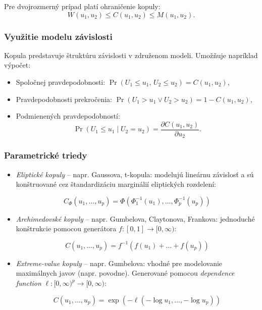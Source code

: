 Pre dvojrozmerný prípad platí ohraničenie kopuly:
\[
W(u_1, u_2) \leq C(u_1, u_2) \leq M(u_1, u_2).
\]

\subsubsection{Využitie modelu závislosti}

Kopula predstavuje štruktúru závislosti v združenom modeli. Umožňuje napríklad výpočet:

\begin{itemize}
  \item Spoločnej pravdepodobnosti: $\Pr(U_1 \leq u_1,\, U_2 \leq u_2) = C(u_1, u_2)$,
  \item Pravdepodobnosti prekročenia: $\Pr(U_1 > u_1 \vee U_2 > u_2) = 1 - C(u_1, u_2)$,
  \item Podmienených pravdepodobností:
  \[
  \Pr(U_1 \leq u_1 \mid U_2 = u_2) = \frac{\partial C(u_1, u_2)}{\partial u_2}.
  \]
\end{itemize}

\subsubsection{Parametrické triedy}\label{subsubsec:parametric_copula}

\begin{itemize}
  \item \textit{Eliptické kopuly} – napr. Gaussova, t-kopula: modelujú lineárnu závislosť a sú konštruované cez štandardizáciu marginálií eliptických rozdelení:
  
  \begin{equation}
    C_{\Phi}(u_1, \dots, u_p) = \Phi\left( \Phi_1^{-1}(u_1), \dots, \Phi_p^{-1}(u_p) \right)
  \end{equation}

  \item \textit{Archimedovské kopuly} – napr. Gumbelova, Claytonova, Frankova: jednoduché konštrukcie pomocou generátora $f:[0,1] \to [0,\infty)$:

  \begin{equation}
  C(u_1, \dots, u_p) = f^{-1}\left( f(u_1) + \dots + f(u_p) \right)
  \end{equation}

  \item \textit{Extreme-value kopuly} – napr. Gumbelova: vhodné pre modelovanie maximálnych javov (napr. povodne). Generované pomocou \textit{dependence function} $\ell : [0, \infty)^p \rightarrow [0, \infty)$:

  \begin{equation}
  C(u_1, \dots, u_p) = \exp\left(-\ell(-\log u_1, \dots, -\log u_p)\right)
  \end{equation}
  
\end{itemize}

